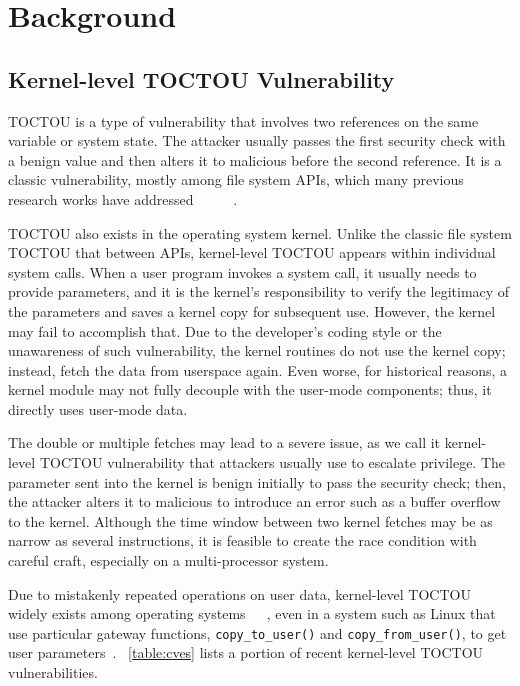 
\section{Background}
\label{sec:ktoctou-background}



\subsection{Kernel-level TOCTOU Vulnerability}

TOCTOU is a type of vulnerability that involves two references on the same variable or system state. The attacker usually passes the first security check with a benign value and then alters it to malicious before the second reference. It is a classic vulnerability, mostly among file system APIs, which many previous research works have addressed ~\cite{dean2004fixing}~\cite{borisov2005fixing}~\cite{bishop1996checking}~\cite{bishop1995race}~\cite{wei2005tocttou}.


TOCTOU also exists in the operating system kernel. Unlike the classic file system TOCTOU that between APIs, kernel-level TOCTOU appears within individual system calls. When a user program invokes a system call, it usually needs to provide parameters, and it is the kernel's responsibility to verify the legitimacy of the parameters and saves a kernel copy for subsequent use. However, the kernel may fail to accomplish that. Due to the developer's coding style or the unawareness of such vulnerability, the kernel routines do not use the kernel copy; instead, fetch the data from userspace again. Even worse, for historical reasons, a kernel module may not fully decouple with the user-mode components; thus, it directly uses user-mode data.


The double or multiple fetches may lead to a severe issue, as we call it kernel-level TOCTOU vulnerability that attackers usually use to escalate privilege. The parameter sent into the kernel is benign initially to pass the security check; then, the attacker alters it to malicious to introduce an error such as a buffer overflow to the kernel. Although the time window between two kernel fetches may be as narrow as several instructions, it is feasible to create the race condition with careful craft, especially on a multi-processor system.


Due to mistakenly repeated operations on user data, kernel-level TOCTOU widely exists among operating systems~\cite{watson2007exploiting}~\cite{yang2012concurrency}~\cite{lu2008learning}, even in a system such as Linux that use particular gateway functions, \texttt{copy\_to\_user()} and \texttt{copy\_from\_user()}, to get user parameters~\cite{double-fetch-linux}. ~\autoref{table:cves} lists a portion of recent kernel-level TOCTOU vulnerabilities.

